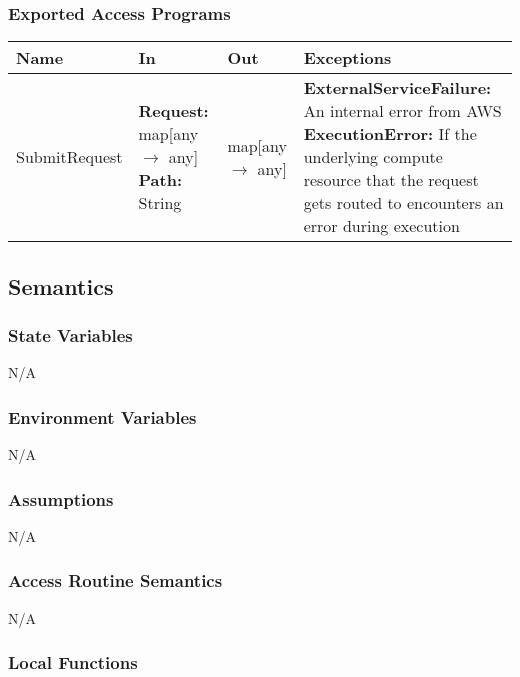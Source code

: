 \documentclass[12pt, titlepage]{article}
\begin{document}
\subsubsection{Exported Access Programs}

\begin{center}
  \begin{tabular}{>{\raggedright}p{3cm} >{\raggedright}p{5cm}
    >{\raggedright}p{4cm} p{4cm}}
    \hline
    \textbf{Name} & \textbf{In} & \textbf{Out} & \textbf{Exceptions} \\
    \hline
    SubmitRequest & \textbf{Request:} map[any $\rightarrow$ any]
    \newline \textbf{Path:} String & map[any $\rightarrow$ any] &
    \textbf{ExternalServiceFailure:} An internal error from
    AWS \newline \textbf{ExecutionError:} If the underlying compute
    resource that the request gets routed to encounters an error
    during execution \\
    \hline
  \end{tabular}
\end{center}

\subsection{Semantics}

\subsubsection{State Variables}

N/A

\subsubsection{Environment Variables}

N/A

\subsubsection{Assumptions}

N/A

\subsubsection{Access Routine Semantics}

N/A

\subsubsection{Local Functions}
\end{document}

